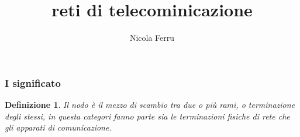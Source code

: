 \message{ !name(reti.tex)}\documentclass{book}
\title{reti di telecominicazione}
\author{Nicola Ferru}
\newtheorem{defi}{Definizione}[section]
\begin{document}


\subsubsection{I significato}
\label{sec:significato}
\begin{defi}
  Il nodo è il mezzo di scambio tra due o più rami, o terminazione degli stessi,
  in questa categori fanno parte sia le terminazioni fisiche di rete che
  gli apparati di comunicazione.
\end{defi}

\end{document}
